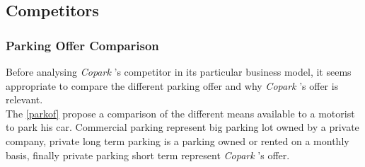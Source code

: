 \documentclass[12pt,a4paper,oneside]{book}
\newcommand{\bp}{\textit{Copark }}
\begin{document}
\subsection{Competitors}
\subsubsection{Parking Offer Comparison}
\label{poc}
Before analysing \bp 's competitor in its particular business model, it seems appropriate to compare the different parking offer and why \bp 's offer is relevant.\\

The \autoref{parkof} propose a comparison of the different means available to a motorist to park his car. Commercial parking represent big parking lot owned by a private company, private long term parking is a parking owned or rented on a monthly basis, finally private parking short term represent \bp 's offer.
\end{document}
